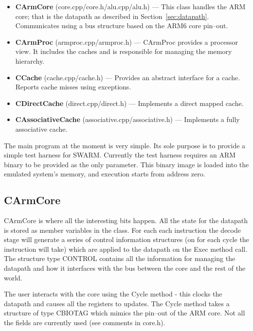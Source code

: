 \documentclass[10pt,a4paper]{article}
\begin{document}
\begin{itemize}
\itemsep 0pt
\parsep 0pt

\item \textbf{CArmCore} (core.cpp/core.h/alu.cpp/alu.h) --- This class
handles the ARM core; that is the datapath as described in
Section~\ref{sec:datapath}. Communicates using a bus structure based
on the ARM6 core pin--out. 

\item \textbf{CArmProc} (armproc.cpp/armproc.h) --- CArmProc provides
a processor view. It includes the caches and is responsible for
managing the memory hierarchy. 

\item \textbf{CCache} (cache.cpp/cache.h) --- Provides an abstract
interface for a cache. Reports cache misses using exceptions.

\item \textbf{CDirectCache} (direct.cpp/direct.h) --- Implements a
direct mapped cache.

\item \textbf{CAssociativeCache} (associative.cpp/associative.h) ---
Implements a fully associative cache.

\end{itemize}

The main program at the moment is very simple. Its sole purpose is to
provide a simple test harness for SWARM. Currently the test harness
requires an ARM binary to be provided as the only parameter. This
binary image is loaded into the emulated system's memory, and
execution starts from address zero.


\subsection{CArmCore} %
\label{sec:carmcore}  %

CArmCore is where all the interesting bits happen. All the state for
the datapath is stored as member variables in the class. For each
each instruction the decode stage will generate a series of control
information structures (on for each cycle the instruction will take)
which are applied to the datapath on the Exec method call. The
structure type CONTROL contains all the information for managing the
datapath and how it interfaces with the bus between the core and the
rest of the world.

The user interacts with the core using the Cycle method - this clocks
the datapath and causes all the registers to updates. The Cycle method
takes a structure of type CBIOTAG which mimics the pin--out of the ARM
core. Not all the fields are currently used (see comments in core.h).
\end{document}
